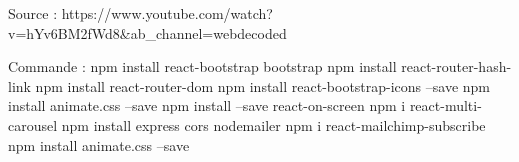 Source :
https://www.youtube.com/watch?v=hYv6BM2fWd8&ab_channel=webdecoded

Commande :
npm install react-bootstrap bootstrap
npm install react-router-hash-link  
npm install react-router-dom 
npm install react-bootstrap-icons --save
npm install animate.css --save
npm install --save react-on-screen
npm i react-multi-carousel
npm install express cors nodemailer
npm i react-mailchimp-subscribe
npm install animate.css --save